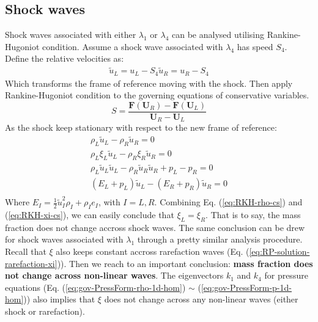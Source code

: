 \subsection{Shock waves}
Shock waves associated with either $\lambda_1$ or $\lambda_4$ can be analysed utilising Rankine-Hugoniot condition. Assume a shock wave associated with $\lambda_4$ has speed $S_4$. Define the relative velocities as:
\begin{eqnarray}
\tilde{u}_L = u_L - S_4
\tilde{u}_R = u_R - S_4
\end{eqnarray}
Which transforms the frame of reference moving with the shock. Then apply Rankine-Hugoniot condition to the governing equations of conservative variables.
\begin{equation}
S=\frac{\textbf{F}(\textbf{U}_R)-\textbf{F}(\textbf{U}_L)}{\textbf{U}_R - \textbf{U}_L}
\end{equation}
As the shock keep stationary with respect to the new frame of reference:
\begin{eqnarray}
\rho_L \tilde{u}_L - \rho_R \tilde{u}_R = 0 \label{eq:RKH-rho-cs}\\
\rho_L \xi_L \tilde{u}_L - \rho_R \xi_R \tilde{u}_R = 0 \label{eq:RKH-xi-cs} \\
\rho_L \tilde{u}_L \tilde{u}_L - \rho_R \tilde{u}_R \tilde{u}_R + p_L - p_R = 0 \label{eq:RKH-u-cs} \\
(E_L + p_L) \tilde{u}_L - (E_R + p_R) \tilde{u}_R = 0 \label{eq:RKH-E-cs}\\
\end{eqnarray}
Where $E_I = \frac{1}{2} \tilde{u}^2_I \rho_I + \rho_I e_I$, with $I = L , R$.
Combining Eq. (\ref{eq:RKH-rho-cs}) and (\ref{eq:RKH-xi-cs}), we can easily conclude that $\xi_L = \xi_R$. That is to say, the mass fraction does not change accross shock waves. The same conclusion can be drew for shock waves associated with $\lambda_1$ through a pretty similar analysis procedure. Recall that $\xi$ also keeps constant accross rarefaction waves (Eq. (\ref{eq:RP-solution-rarefaction-xi})). Then we reach to an important conclusion: \textbf{mass fraction does not change across non-linear waves}. The eigenvectors $k_1$ and $k_4$ for pressure equations (Eq. (\ref{eq:gov-PressForm-rho-1d-hom}) $\sim$ (\ref{eq:gov-PressForm-p-1d-hom})) also implies that $\xi$ does not change across any non-linear waves (either shock or rarefaction).

